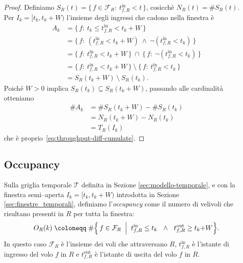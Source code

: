     \begin{proof}
    Definiamo $S_R(t)=\{\,f\in\mathcal{F}_R:\ t^{\mathrm{in}}_{f,R}<t\,\}$, cosicchè $N_R(t)=\#S_R(t)$.
    Per $I_k=[t_k,t_k{+}W)$ l’insieme degli ingressi che cadono nella finestra è
    \[
    \begin{aligned}
    A_k
    &= \bigl\{\,f:\ t_k \le t^{\mathrm{in}}_{f,R} < t_k+W\,\bigr\} 
    \\[2pt]
    &= \bigl\{\,f:\ (t^{\mathrm{in}}_{f,R} < t_k+W)\ \wedge\ \neg(t^{\mathrm{in}}_{f,R} < t_k)\,\bigr\}
    \\[2pt]
    &= \bigl\{\,f:\ t^{\mathrm{in}}_{f,R} < t_k+W\,\bigr\}
       \ \cap\ 
       \bigl\{\,f:\ \neg(t^{\mathrm{in}}_{f,R} < t_k)\,\bigr\}
    \\[2pt]
    &= \bigl\{\,f:\ t^{\mathrm{in}}_{f,R} < t_k+W\,\bigr\}
       \ \setminus\ 
       \bigl\{\,f:\ t^{\mathrm{in}}_{f,R} < t_k\,\bigr\}
    \\[2pt]
    &= S_R(t_k{+}W)\ \setminus\ S_R(t_k).
    \end{aligned}
    \]
    Poiché $W>0$ implica $S_R(t_k)\subseteq S_R(t_k{+}W)$, passando alle cardinalità otteniamo
    \[
    \begin{aligned}
    \#A_k
    &=\#S_R(t_k{+}W)-\#S_R(t_k)
    \\[2pt]
    &=N_R(t_k{+}W)-N_R(t_k) \\[2pt]
    &=T_R(I_k)
    \end{aligned}
    \]
    che è proprio~\eqref{eq:throughput-diff-cumulate}.
    \end{proof}
    
    
\subsection{Occupancy}
\label{subsec:occupancy-teoria}
Sulla griglia temporale \(\mathcal{T}\) definita in Sezione \ref{sec:modello-temporale}, e con la finestra semi–aperta \(I_k=[t_k,t_k+W)\) introdotta in Sezione \ref{sec:finestre_temporali}, definiamo l’\emph{occupancy} come il numero di velivoli che risultano presenti in \(R\) per tutta la finestra:
    \begin{equation}
    \label{eq:occ-finestra-copertura}
    O_R(k) \;\coloneqq\; 
    \#\Bigl\{\, f \in \mathcal{F}_R \;\Bigm|\; 
    t^{\mathrm{in}}_{f,R} \le t_k \ \ \wedge\ \ t^{\mathrm{out}}_{f,R} \ge t_k{+}W \Bigr\}.
    \end{equation}
    In questo caso \(\mathcal{F}_R\) è l’insieme dei voli che attraversano \(R\), \(t^{\mathrm{in}}_{f,R}\) è l’istante di ingresso del volo \(f\) in \(R\) e \(t^{\mathrm{out}}_{f,R}\) è l’istante di uscita del volo \(f\) in \(R\).
  
